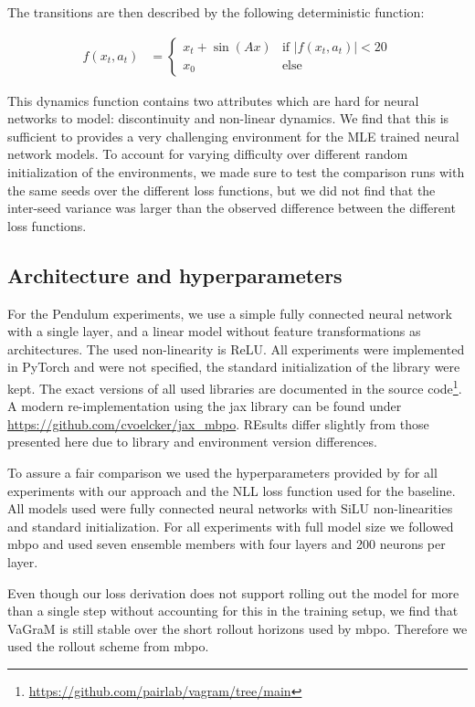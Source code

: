 The transitions are then described by the following deterministic function:

\begin{align}
    f(x_t,a_t) &= 
  \begin{cases}
    x_t + \sin(A x) & \text{if } |f(x_t,a_t)| < 20\\
    x_0 & \text{else}
  \end{cases}
\end{align}

This dynamics function contains two attributes which are hard for neural networks to model: discontinuity and non-linear dynamics.
We find that this is sufficient to provides a very challenging environment for the MLE trained neural network models.
To account for varying difficulty over different random initialization of the environments, we made sure to test the comparison runs with the same seeds over the different loss functions, but we did not find that the inter-seed variance was larger than the observed difference between the different loss functions.

\subsection{Architecture and hyperparameters}
For the Pendulum experiments, we use a simple fully connected neural network with a single layer, and a linear model without feature transformations as architectures.
The used non-linearity is ReLU.
All experiments were implemented in PyTorch \parencite{pytorch} and were not specified, the standard initialization of the library were kept.
The exact versions of all used libraries are documented in the source code\footnote{\url{https://github.com/pairlab/vagram/tree/main}}.
A modern re-implementation using the jax library can be found under \url{https://github.com/cvoelcker/jax_mbpo}.
REsults differ slightly from those presented here due to library and environment version differences.

To assure a fair comparison we used the hyperparameters provided by \textcite{janner2019mbpo} for all experiments with our approach and the NLL loss function used for the baseline.
All models used were fully connected neural networks with SiLU non-linearities and standard initialization.
For all experiments with full model size we followed \ac{mbpo} and used seven ensemble members with four layers and 200 neurons per layer.

Even though our loss derivation does not support rolling out the model for more than a single step without accounting for this in the training setup, we find that VaGraM is still stable over the short rollout horizons used by \ac{mbpo}.
Therefore we used the rollout scheme from \ac{mbpo}.

